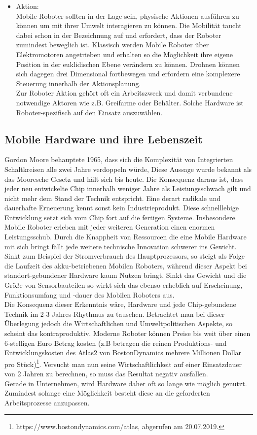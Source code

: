 \documentclass[twoside,11pt, a4paper]{report}
\begin{document}
\begin{itemize}
		\item Aktion:\\
		Mobile Roboter sollten in der Lage sein, physische Aktionen ausführen zu können um mit ihrer Umwelt interagieren zu können. Die Mobilität taucht dabei schon in der Bezeichnung auf und erfordert, dass der Roboter zumindest beweglich ist. Klassisch werden Mobile Roboter über Elektromotoren angetrieben und erhalten so die Möglichkeit ihre eigene Position in der euklidischen Ebene verändern zu können. Drohnen können sich dagegen drei Dimensional fortbewegen und erfordern eine komplexere Steuerung innerhalb der Aktionsplanung.\\
		Zur Roboter Aktion gehört oft ein Arbeitszweck und damit verbundene notwendige Aktoren wie z.B. Greifarme oder Behälter. Solche Hardware ist Roboter-spezifisch auf den Einsatz auszuwählen. 
	\end{itemize}
	
	
	
	\subsection{Mobile Hardware und ihre Lebenszeit}
	Gordon Moore behauptete 1965, dass sich die Komplexität von Integrierten Schaltkreisen alle zwei Jahre verdoppeln würde, \cite{Moore1965} Diese Aussage wurde bekannt als das Mooresche Gesetz und hält sich bis heute. Die Konsequenz daraus ist, dass jeder neu entwickelte Chip innerhalb weniger Jahre als Leistungsschwach gilt und nicht mehr dem Stand der Technik entspricht. Eine derart radikale und dauerhafte Erneuerung kennt sonst kein Industrieprodukt. Diese schnelllebige Entwicklung setzt sich vom Chip fort auf die fertigen Systeme. Insbesondere Mobile Roboter erleben mit jeder weiteren Generation einen enormen Leistungsschub. Durch die Knappheit von Ressourcen die eine Mobile Hardware mit sich bringt fällt jede weitere technische Innovation schwerer ins Gewicht. Sinkt zum Beispiel der Stromverbrauch des Hauptprozessors, so steigt als Folge die Laufzeit des akku-betriebenen Mobilen Roboters, während dieser Aspekt bei standort-gebundener Hardware kaum Nutzen bringt. Sinkt das Gewicht und die Größe von Sensorbauteilen so wirkt sich das ebenso erheblich auf Erscheinung, Funktionsumfang und -dauer des Mobilen Roboters aus. \\
	Die Konsequenz dieser Erkenntnis wäre, Hardware und jede Chip-gebundene Technik im 2-3 Jahres-Rhythmus zu tauschen. Betrachtet man bei dieser Überlegung jedoch die Wirtschaftlichen und Umweltpolitischen Aspekte, so scheint das kontraproduktiv. Moderne Roboter können Preise bis weit über einen 6-stelligen Euro Betrag kosten (z.B betragen die reinen Produktions- und Entwicklungskosten des Atlas2 von BostonDynamics mehrere Millionen Dollar pro Stück)\footnote{https://www.bostondynamics.com/atlas, abgerufen am 20.07.2019.}. Versucht man nun seine Wirtschaftlichkeit auf einer Einsatzdauer von 2 Jahren zu berechnen, so muss das Resultat negativ ausfallen. \\
	Gerade in Unternehmen, wird Hardware daher oft so lange wie möglich genutzt. Zumindest solange eine Möglichkeit besteht diese an die geforderten Arbeitsprozesse anzupassen. \\
	
\end{document}
